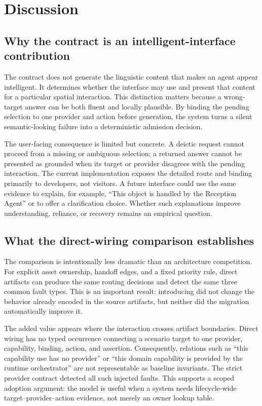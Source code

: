 \section{Discussion}
\label{sec:discussion}

\subsection{Why the contract is an intelligent-interface contribution}

The contract does not generate the linguistic content that makes an agent
appear intelligent.  It determines whether the interface may use and present
that content for a particular spatial interaction.  This distinction matters
because a wrong-target answer can be both fluent and locally plausible.  By
binding the pending selection to one provider and action before generation, the
system turns a silent semantic-looking failure into a deterministic admission
decision.

The user-facing consequence is limited but concrete.  A deictic request cannot
proceed from a missing or ambiguous selection; a returned answer cannot be
presented as grounded when its target or provider disagrees with the pending
interaction.  The current implementation exposes the detailed route and
binding primarily to developers, not visitors.  A future interface could use
the same evidence to explain, for example, ``This object is handled by the
Reception Agent'' or to offer a clarification choice.  Whether such
explanations improve understanding, reliance, or recovery remains an empirical
question.

\subsection{What the direct-wiring comparison establishes}

The comparison is intentionally less dramatic than an architecture
competition.  For explicit asset ownership, handoff edges, and a fixed priority
rule, direct artifacts can produce the same routing decisions and detect the
same three common fault types.  This is an important result: introducing
\systemname{} did not change the behavior already encoded in the source
artifacts, but neither did the migration automatically improve it.

The added value appears where the interaction crosses artifact boundaries.
Direct wiring has no typed occurrence connecting a scenario target to one
provider, capability, binding, action, and assertion.  Consequently, relations
such as ``this capability use has no provider'' or ``this domain capability is
provided by the runtime orchestrator'' are not representable as baseline
invariants.  The strict provider contract detected all such injected faults.
This supports a scoped adoption argument: the model is useful when a system
needs lifecycle-wide target--provider--action evidence, not merely an owner
lookup table.

